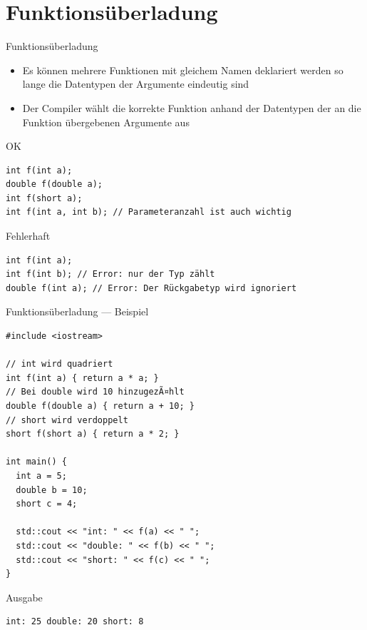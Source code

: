 \documentclass[presentation]{beamer}
\begin{document}
\section{Funktionsüberladung}
\label{sec:org390ce43}
\begin{frame}[label={sec:org1f59737},fragile]{Funktionsüberladung}
 \begin{itemize}
\item Es können mehrere Funktionen mit \alert{gleichem Namen} deklariert werden
so lange die \alert{Datentypen der Argumente eindeutig} sind
\item Der \alert{Compiler wählt die korrekte Funktion} anhand der Datentypen der
an die Funktion übergebenen Argumente aus
\end{itemize}
\begin{block}{OK}
\begin{verbatim}
int f(int a);
double f(double a);
int f(short a);
int f(int a, int b); // Parameteranzahl ist auch wichtig
\end{verbatim}
\end{block}
\begin{block}{Fehlerhaft}
\begin{verbatim}
int f(int a);
int f(int b); // Error: nur der Typ zählt
double f(int a); // Error: Der Rückgabetyp wird ignoriert
\end{verbatim}
\end{block}
\end{frame}
\begin{frame}[label={sec:org1189eac},fragile]{Funktionsüberladung --- Beispiel}
 \begin{verbatim}
#include <iostream>

// int wird quadriert
int f(int a) { return a * a; }
// Bei double wird 10 hinzugezÃ¤hlt
double f(double a) { return a + 10; }
// short wird verdoppelt
short f(short a) { return a * 2; }

int main() {
  int a = 5;
  double b = 10;
  short c = 4;

  std::cout << "int: " << f(a) << " ";
  std::cout << "double: " << f(b) << " ";
  std::cout << "short: " << f(c) << " ";
}
\end{verbatim}
\begin{block}{Ausgabe}
\begin{verbatim}
int: 25 double: 20 short: 8
\end{verbatim}
\end{block}
\end{frame}
\end{document}

